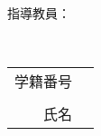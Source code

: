 \begin{titlepage}
\begin{center}{\large
\nendo ~~\daigaku ~\gakubu ~~\syubetsu
}
\end{center}
\begin{flushright}

{\large
指導教員： \chiefexaminer \\ %
}
\end{flushright}

\begin{center}
\vspace*{150truept}
{\huge \thesistitle}\\ %
\vspace{170truept}
{\Large
\begin{tabular}{rl}
学籍番号 & \hspace{1zw}{\snum}\\
 & \\
氏名 & \hspace{1zw}{\jname}\\
\end{tabular}
}\\
\vspace{70truept}
{\large \teisyutsu}\\ %
\end{center}
\end{titlepage}